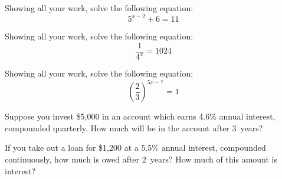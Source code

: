 \documentclass[11pt,letterpaper]{article}
\begin{document}
 Showing all your work, solve the following equation:
	\[
	5^{x - 2} + 6= 11
	\]



\newpage



 Showing all your work, solve the following equation:
	\[
	\dfrac{1}{4^x}= 1024
	\]



\newpage



 Showing all your work, solve the following equation:
	\[
	\left( \dfrac{2}{3} \right)^{5x - 7}= 1
	\]



\newpage



 Suppose you invest \$5,000 in an account which earns 4.6\% annual interest, compounded quarterly. How much will be in the account after 3~years?



\newpage


 If you take out a loan for \$1,200 at a 5.5\% annual interest, compounded continuously, how much is owed after 2~years? How much of this amount is interest?
\end{document}

